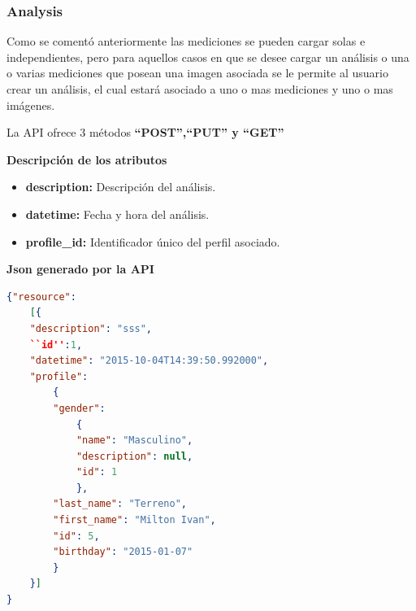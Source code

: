 \documentclass[a4paper,12pt]{article}
\begin{document}
\clearpage

\subsubsection{Analysis}
Como se comentó anteriormente las mediciones se pueden cargar solas e independientes, pero para aquellos casos en que se desee cargar un análisis o una o varias mediciones que posean una imagen asociada se le permite al usuario crear un análisis, el cual estará asociado a uno o mas mediciones y uno o mas imágenes.

La API ofrece 3 métodos \textbf{``POST'',``PUT'' y ``GET''}


\textbf{Descripción de los atributos}
\begin{itemize}
	\item \textbf{description:} Descripción del análisis.
	\item \textbf{datetime: }	Fecha y hora del análisis.	
	\item \textbf{profile\_id: } Identificador único del perfil asociado.
\end{itemize}

\textbf{Json generado por la API} 
\begin{lstlisting}[language=json,firstnumber=1]
{"resource":     
	[{
	"description": "sss",
	``id'':​1,
	"datetime": "2015-10-04T14:39:50.992000",
	"profile": 
		{
		"gender": 
			{
			"name": "Masculino",
			"description": null,
			"id": ​1
			},
		"last_name": "Terreno",
		"first_name": "Milton Ivan",
		"id": ​5,
		"birthday": "2015-01-07"
		}
	}]
}

\end{lstlisting}
\end{document}
